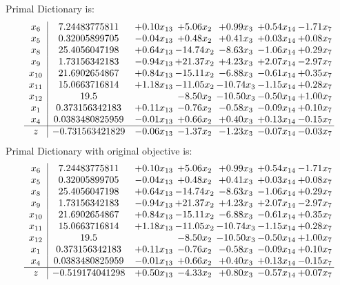 \documentclass[9pt]{article}
\begin{document}
Primal Dictionary is:
\[\begin{array}{c| c c@{\hskip 2pt} c@{\hskip 2pt} c@{\hskip 2pt} c@{\hskip 2pt} c@{\hskip 2pt} }
 x_{6}   &  7.24483775811 & +  0.10 x_{13} & +  5.06 x_{2} & +  0.99 x_{3} & +  0.54 x_{14} & -1.71 x_{7}\\
 x_{5}   &  0.32005899705 & -0.04 x_{13} & +  0.48 x_{2} & +  0.41 x_{3} & +  0.03 x_{14} & +  0.08 x_{7}\\
 x_{8}   &  25.4056047198 & +  0.64 x_{13} & -14.74 x_{2} & -8.63 x_{3} & -1.06 x_{14} & +  0.29 x_{7}\\
 x_{9}   &  1.73156342183 & -0.94 x_{13} & + 21.37 x_{2} & +  4.23 x_{3} & +  2.07 x_{14} & -2.97 x_{7}\\
 x_{10}   &  21.6902654867 & +  0.84 x_{13} & -15.11 x_{2} & -6.88 x_{3} & -0.61 x_{14} & +  0.35 x_{7}\\
 x_{11}   &  15.0663716814 & +  1.18 x_{13} & -11.05 x_{2} & -10.74 x_{3} & -1.15 x_{14} & +  0.28 x_{7}\\
 x_{12}   &  19.5  &   & -8.50 x_{2} & -10.50 x_{3} & -0.50 x_{14} & +  1.00 x_{7}\\
 x_{1}   &  0.373156342183 & +  0.11 x_{13} & -0.76 x_{2} & -0.58 x_{3} & -0.09 x_{14} & +  0.10 x_{7}\\
 x_{4}   &  0.0383480825959 & -0.01 x_{13} & +  0.66 x_{2} & +  0.40 x_{3} & +  0.13 x_{14} & -0.15 x_{7}\\
\hline
z    &  -0.731563421829 & -0.06 x_{13} & -1.37 x_{2} & -1.23 x_{3} & -0.07 x_{14} & -0.03 x_{7}\\
\end{array}\]
Primal Dictionary with original objective is:
\[\begin{array}{c| c c@{\hskip 2pt} c@{\hskip 2pt} c@{\hskip 2pt} c@{\hskip 2pt} c@{\hskip 2pt} }
 x_{6}   &  7.24483775811 & +  0.10 x_{13} & +  5.06 x_{2} & +  0.99 x_{3} & +  0.54 x_{14} & -1.71 x_{7}\\
 x_{5}   &  0.32005899705 & -0.04 x_{13} & +  0.48 x_{2} & +  0.41 x_{3} & +  0.03 x_{14} & +  0.08 x_{7}\\
 x_{8}   &  25.4056047198 & +  0.64 x_{13} & -14.74 x_{2} & -8.63 x_{3} & -1.06 x_{14} & +  0.29 x_{7}\\
 x_{9}   &  1.73156342183 & -0.94 x_{13} & + 21.37 x_{2} & +  4.23 x_{3} & +  2.07 x_{14} & -2.97 x_{7}\\
 x_{10}   &  21.6902654867 & +  0.84 x_{13} & -15.11 x_{2} & -6.88 x_{3} & -0.61 x_{14} & +  0.35 x_{7}\\
 x_{11}   &  15.0663716814 & +  1.18 x_{13} & -11.05 x_{2} & -10.74 x_{3} & -1.15 x_{14} & +  0.28 x_{7}\\
 x_{12}   &  19.5  &   & -8.50 x_{2} & -10.50 x_{3} & -0.50 x_{14} & +  1.00 x_{7}\\
 x_{1}   &  0.373156342183 & +  0.11 x_{13} & -0.76 x_{2} & -0.58 x_{3} & -0.09 x_{14} & +  0.10 x_{7}\\
 x_{4}   &  0.0383480825959 & -0.01 x_{13} & +  0.66 x_{2} & +  0.40 x_{3} & +  0.13 x_{14} & -0.15 x_{7}\\
\hline
z    &  -0.519174041298 & +  0.50 x_{13} & -4.33 x_{2} & +  0.80 x_{3} & -0.57 x_{14} & +  0.07 x_{7}\\
\end{array}\]
\end{document}

